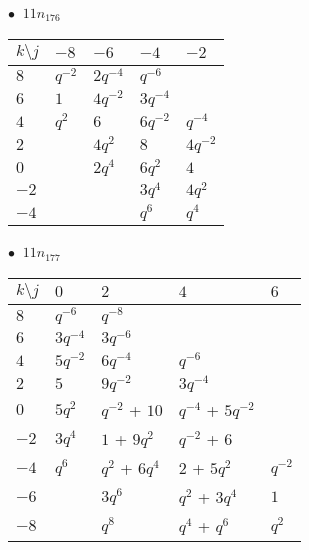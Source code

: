 \begin{minipage}{\linewidth}
$\bullet\ $ $11n_{176}$ \vspace{0.5em} \\
\begin{tabular}{l|llll}
$k \setminus j$ & $-8$ & $-6$ & $-4$ & $-2$ \\
\hline
$8$ & $q^{-2}$ & $2q^{-4}$ & $q^{-6}$ &  \\
$6$ & $1$ & $4q^{-2}$ & $3q^{-4}$ &  \\
$4$ & $q^{2}$ & $6$ & $6q^{-2}$ & $q^{-4}$ \\
$2$ &  & $4q^{2}$ & $8$ & $4q^{-2}$ \\
$0$ &  & $2q^{4}$ & $6q^{2}$ & $4$ \\
$-2$ &  &  & $3q^{4}$ & $4q^{2}$ \\
$-4$ &  &  & $q^{6}$ & $q^{4}$ \\
\end{tabular}
\vspace{2em}
\end{minipage}
%
\begin{minipage}{\linewidth}
$\bullet\ $ $11n_{177}$ \vspace{0.5em} \\
\begin{tabular}{l|llll}
$k \setminus j$ & $0$ & $2$ & $4$ & $6$ \\
\hline
$8$ & $q^{-6}$ & $q^{-8}$ &  &  \\
$6$ & $3q^{-4}$ & $3q^{-6}$ &  &  \\
$4$ & $5q^{-2}$ & $6q^{-4}$ & $q^{-6}$ &  \\
$2$ & $5$ & $9q^{-2}$ & $3q^{-4}$ &  \\
$0$ & $5q^{2}$ & $q^{-2}$ + $10$ & $q^{-4}$ + $5q^{-2}$ &  \\
$-2$ & $3q^{4}$ & $1$ + $9q^{2}$ & $q^{-2}$ + $6$ &  \\
$-4$ & $q^{6}$ & $q^{2}$ + $6q^{4}$ & $2$ + $5q^{2}$ & $q^{-2}$ \\
$-6$ &  & $3q^{6}$ & $q^{2}$ + $3q^{4}$ & $1$ \\
$-8$ &  & $q^{8}$ & $q^{4}$ + $q^{6}$ & $q^{2}$ \\
\end{tabular}
\vspace{2em}
\end{minipage}
%
